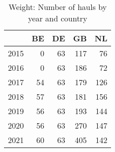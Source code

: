 \begin{table}[ht]
\centering
\begin{tabular}{rrrrr}
  \hline
 & BE & DE & GB & NL \\ 
  \hline
2015 & 0 & 63 & 117 & 76 \\ 
  2016 & 0 & 63 & 186 & 72 \\ 
  2017 & 54 & 63 & 179 & 126 \\ 
  2018 & 57 & 63 & 181 & 156 \\ 
  2019 & 56 & 63 & 193 & 144 \\ 
  2020 & 56 & 63 & 270 & 147 \\ 
  2021 & 60 & 63 & 405 & 142 \\ 
   \hline
\end{tabular}
\caption{Weight: Number of hauls by year and country} 
\end{table}
